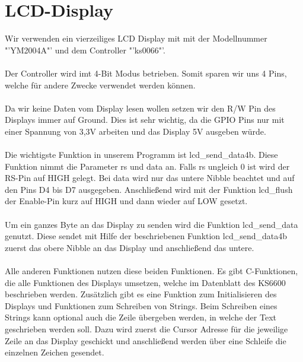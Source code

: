 \section{LCD-Display}

Wir verwenden ein vierzeiliges LCD Display mit mit der Modellnummer "'YM2004A"' und dem Controller "'ks0066"'.\\
\\
Der Controller wird imt 4-Bit Modus betrieben. Somit sparen wir uns 4 Pins, welche für andere Zwecke verwendet werden können.\\
\\
Da wir keine Daten vom Display lesen wollen setzen wir den R/W Pin des Displays immer auf Ground. Dies ist sehr wichtig, da die GPIO Pins nur mit einer Spannung von 3,3V arbeiten und das Display 5V ausgeben würde.\\
\\
Die wichtigste Funktion in unserem Programm ist lcd\_send\_data4b. Diese Funktion nimmt die Parameter rs und data an. Falls rs ungleich 0 ist wird der RS-Pin auf HIGH gelegt. Bei data wird nur das untere Nibble beachtet und auf den Pins D4 bis D7 ausgegeben. Anschließend wird mit der Funktion lcd\_flush der Enable-Pin kurz auf HIGH und dann wieder auf LOW gesetzt.\\
\\
Um ein ganzes Byte an das Display zu senden wird die Funktion lcd\_send\_data genutzt. Diese sendet mit Hilfe der beschriebenen Funktion lcd\_send\_data4b zuerst das obere Nibble an das Display und anschließend das untere.\\
\\
Alle anderen Funktionen nutzen diese beiden Funktionen. Es gibt C-Funktionen, die alle Funktionen des Displays umsetzen, welche im Datenblatt des KS6600 beschrieben werden. Zusätzlich gibt es eine Funktion zum Initialisieren des Displays und Funktionen zum Schreiben von Strings. Beim Schreiben eines Strings kann optional auch die Zeile übergeben werden, in welche der Text geschrieben werden soll. Dazu wird zuerst die Cursor Adresse für die jeweilige Zeile an das Display geschickt und anschließend werden über eine Schleife die einzelnen Zeichen gesendet.
